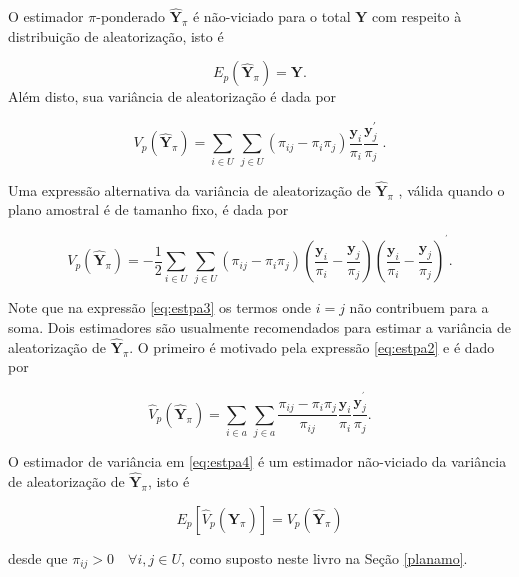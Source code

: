 \documentclass[]{book}
\numberwithin{example}{chapter}
\numberwithin{remark}{chapter}
\numberwithin{definition}{chapter}
\begin{document}
O estimador \(\pi\)-ponderado \(\mathbf{\hat{Y}}_{\pi}\) é não-viciado
para o total \(\mathbf{Y}\) com respeito à distribuição de
aleatorização, isto é

\[
E_p \left( \mathbf{\hat{Y}}_{\pi} \right) = \mathbf{Y} . 
\] Além disto, sua variância de aleatorização é dada por

\begin{equation}
V_p \left( \mathbf{\hat{Y}}_{\pi} \right) = \sum_{ i \in U} \, \sum_{j \in U} \left( \pi _{ij} - \pi_i \pi_j \right) \frac{ \mathbf{y}_i} {\pi_i} \frac{\mathbf{y}_j ^{\prime} } {\pi_j} \; .  \label{eq:estpa2}
\end{equation}

Uma expressão alternativa da variância de aleatorização de
\(\mathbf{\hat{Y}}_{\pi}\) , válida quando o plano amostral é de tamanho
fixo, é dada por

\begin{equation}
V_p \left( \mathbf{\hat{Y}}_{\pi} \right) = -\frac{1}{2} \sum_{i \in U} \, \sum_{j \in U} \left( \pi_{ij} - \pi_i \pi_j \right) \left( \frac{\mathbf{y}_i} {\pi_i} - \frac{\mathbf{y}_j} {\pi_j} \right) \left( \frac{\mathbf{y}_i} {\pi_i} - \frac{\mathbf{y}_j} {\pi_j} \right) ^{^{\prime}}.  \label{eq:estpa3}
\end{equation}

Note que na expressão \eqref{eq:estpa3} os termos onde \(i=j\) não
contribuem para a soma. Dois estimadores são usualmente recomendados
para estimar a variância de aleatorização de \(\mathbf{\hat{Y}}_{\pi}\).
O primeiro é motivado pela expressão \eqref{eq:estpa2} e é dado por

\begin{equation}
\hat{V}_p \left( \mathbf{\hat{Y}}_{\pi} \right) = \sum_{i \in a} \, \sum_{j \in a} \frac{\pi_{ij} - \pi_i \pi_j} {\pi_{ij}} \frac{\mathbf{y}_i} {\pi_i} \frac{\mathbf{y}_j^{^{\prime}}} {\pi_j} \mbox{.}  \label{eq:estpa4}
\end{equation}

O estimador de variância em \eqref{eq:estpa4} é um estimador não-viciado
da variância de aleatorização de \(\mathbf{\hat{Y}}_{\pi}\), isto é

\begin{equation}
E_p \left[ \hat{V}_p \left( \mathbf{\hat{Y}}_{\pi} \right) \right] = V_p \left( \mathbf{\hat{Y}}_{\pi} \right) \label{eq:estpa5}
\end{equation}

desde que \(\pi _{ij} > 0 \quad \forall i,j \in U\), como suposto neste
livro na Seção \ref{planamo}.
\end{document}
